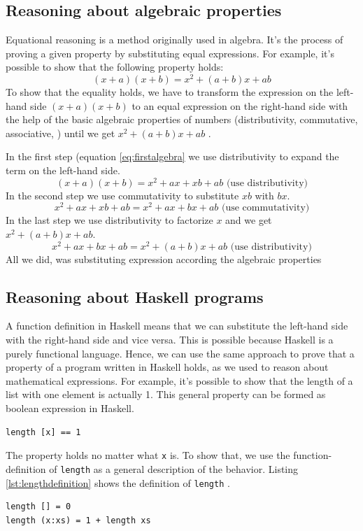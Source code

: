 \subsection{Reasoning about algebraic properties}

Equational reasoning is a method originally used in algebra. It's the process of proving a given property by substituting equal expressions.
For example, it's possible to show that the following property holds:
\begin{equation}
  \label{eq:sum}
  (x+a)(x+b) = x^2 + (a+b)x+ab
\end{equation}
To show that the equality holds, we have to transform the expression on the left-hand side  $(x+a)(x+b)$  to an equal expression on the right-hand side with the help of the basic algebraic properties of numbers (distributivity, commutative, associative, ) until we get $x^2 + (a+b)x+ab$  \cite{hutton}. 

In the first step (equation \ref{eq:firstalgebra} we use distributivity to expand the term on the left-hand side.
\begin{equation}
  \label{eq:firstalgebra}
  (x+a)(x+b) = x^2 + ax + xb + ab \text{     (use distributivity)}
\end{equation}
In the second step we use commutativity to substitute $xb$ with $bx$.
\begin{equation}
x^2 + ax + xb + ab = x^2 + ax + bx + ab \text{     (use commutativity)}
\end{equation}
In the last step we use distributivity to factorize $x$ and we get $x^2 + (a+b)x+ab$.
\begin{equation}
x^2 + ax + bx + ab = x^2 + (a + b)x + ab \text{     (use distributivity)}
\end{equation}
All we did, was substituting expression according the algebraic properties 

\subsection{Reasoning about Haskell programs}

A function definition in Haskell means that we can substitute the left-hand side with the right-hand side and vice versa. This is possible because Haskell is a purely functional language. Hence, we can use the same approach to prove that a property of a program written in Haskell holds, as we used to reason about mathematical expressions. 
For example, it's possible to show that the length of a list with one element is actually 1. This general property can be formed as boolean expression in Haskell.
\begin{verbatim}
length [x] == 1
\end{verbatim}
The property holds no matter what \verb|x| is. To show that, we use the \gls{function-definition} of \verb|length| as a general description of the behavior. Listing \ref{lst:lengthdefinition} shows the definition of \verb|length| \cite{hutton}.
\begin{lstlisting}[caption={Function definition of length},label={lst:lengthdefinition}]
length [] = 0
length (x:xs) = 1 + length xs  
\end{lstlisting}

